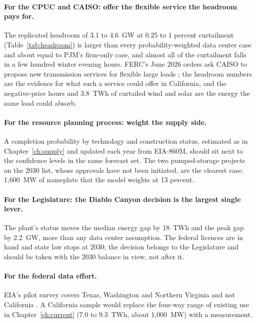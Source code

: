 \paragraph{For the CPUC and CAISO: offer the flexible service the headroom pays for.} The replicated headroom of 3.1 to 4.6~GW at 0.25 to 1 percent curtailment (Table~\ref{tab:headroom}) is larger than every probability-weighted data center case and about equal to PJM's firm-only case, and almost all of the curtailment falls in a few hundred winter evening hours. FERC's June 2026 orders ask CAISO to propose new transmission services for flexible large loads \citep{ferc_showcause2026}; the headroom numbers are the evidence for what such a service could offer in California, and the negative-price hours and 3.8~TWh of curtailed wind and solar are the energy the same load could absorb.

\paragraph{For the resource planning process: weight the supply side.} A completion probability by technology and construction status, estimated as in Chapter~\ref{ch:supply} and updated each year from EIA-860M, should sit next to the confidence levels in the same forecast set. The two pumped-storage projects on the 2030 list, whose approvals have not been initiated, are the clearest case: 1,600~MW of nameplate that the model weights at 13 percent.

\paragraph{For the Legislature: the Diablo Canyon decision is the largest single lever.} The plant's status moves the median energy gap by 18~TWh and the peak gap by 2.2~GW, more than any data center assumption. The federal licences are in hand and state law stops at 2030; the decision belongs to the Legislature and should be taken with the 2030 balance in view, not after it.

\paragraph{For the federal data effort.} EIA's pilot survey covers Texas, Washington and Northern Virginia and not California \citep{eia_pilot2026}. A California sample would replace the four-way range of existing use in Chapter~\ref{ch:current} (7.0 to 9.3~TWh, about 1,000~MW) with a measurement.

